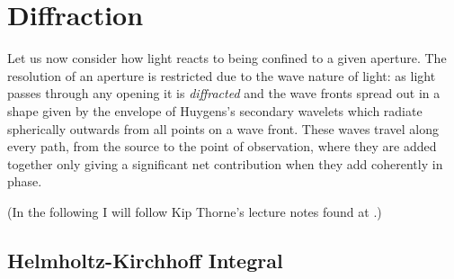 %
\chapter{Diffraction}

Let us now consider how light reacts to being confined to a given aperture. The resolution 
of an aperture is restricted due to the wave nature of light: as light passes through any 
opening it is {\it diffracted} and the wave fronts spread out in a shape given by the 
envelope of Huygens's secondary wavelets which radiate spherically outwards from all points on 
a wave front. These waves travel along every path, from the source to the point of observation,
where they are added together only giving a significant net contribution when they add 
coherently in phase. 

\noindent (In the following I will follow Kip Thorne's lecture notes found at 
.)

\section{Helmholtz-Kirchhoff Integral}

